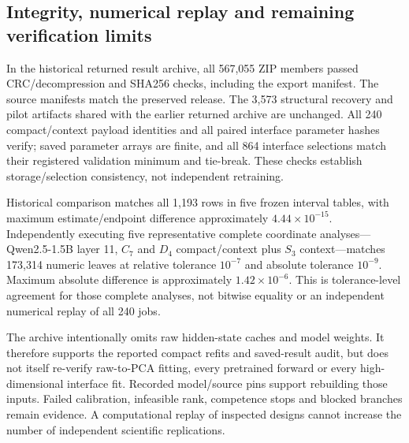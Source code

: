 \subsection{Integrity, numerical replay and remaining verification limits}
In the historical returned result archive, all 567,055 ZIP members passed CRC/decompression and SHA256 checks, including the export manifest. The source manifests match the preserved release. The 3,573 structural recovery and pilot artifacts shared with the earlier returned archive are unchanged. All 240 compact/context payload identities and all paired interface parameter hashes verify; saved parameter arrays are finite, and all 864 interface selections match their registered validation minimum and tie-break. These checks establish storage/selection consistency, not independent retraining.

Historical comparison matches all 1,193 rows in five frozen interval tables, with maximum estimate/endpoint difference approximately $4.44\times10^{-15}$. Independently executing five representative complete coordinate analyses---Qwen2.5-1.5B layer 11, $C_7$ and $D_4$ compact/context plus $S_3$ context---matches 173,314 numeric leaves at relative tolerance $10^{-7}$ and absolute tolerance $10^{-9}$. Maximum absolute difference is approximately $1.42\times10^{-6}$. This is tolerance-level agreement for those complete analyses, not bitwise equality or an independent numerical replay of all 240 jobs.

The archive intentionally omits raw hidden-state caches and model weights. It therefore supports the reported compact refits and saved-result audit, but does not itself re-verify raw-to-PCA fitting, every pretrained forward or every high-dimensional interface fit. Recorded model/source pins support rebuilding those inputs. Failed calibration, infeasible rank, competence stops and blocked branches remain evidence. A computational replay of inspected designs cannot increase the number of independent scientific replications.
